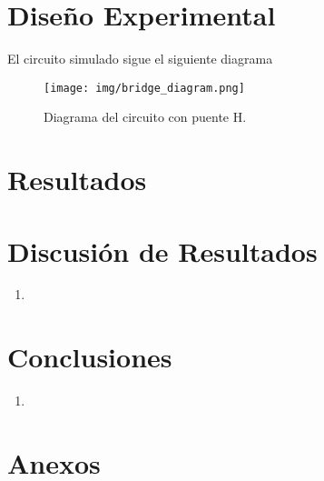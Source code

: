 \documentclass[conference]{IEEEtran}
\begin{document}
\section{Diseño Experimental}
El circuito simulado sigue el siguiente diagrama
\begin{figure}[H]
	\centering
	\texttt{[image: img/bridge\_diagram.png]}
	\caption{Diagrama del circuito con puente H.}
	\label{bridge_diagram}
\end{figure}
%
\section{Resultados}
    
\section{Discusión de Resultados}
\begin{enumerate}
    \item 
   
\end{enumerate}
\section{Conclusiones}
\begin{enumerate}
    \item 
\end{enumerate}

\section{Anexos}
\end{document}
